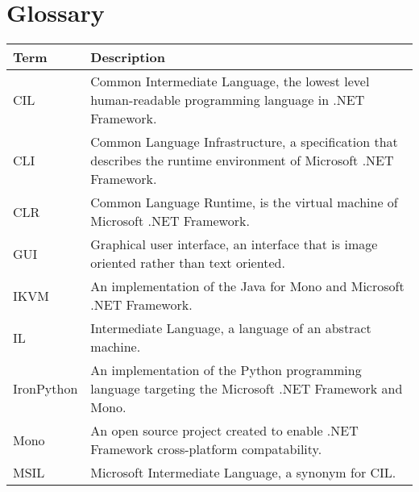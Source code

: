 \chapter*{Glossary}

\begin{center}
	\begin{tabular} { m{3cm} | m{11cm} }
		\hline
		\textbf{Term}	& \textbf{Description} \\ \hline
		CIL				& Common Intermediate Language, the lowest level human-readable programming language in .NET Framework. \\ \hline
		CLI				& Common Language Infrastructure, a specification that describes the runtime environment of Microsoft .NET Framework. \\ \hline
		CLR				& Common Language Runtime, is the virtual machine of Microsoft .NET Framework. \\ \hline
		GUI				& Graphical user interface, an interface that is image oriented rather than text oriented. \\ \hline
		IKVM			& An implementation of the Java for Mono and Microsoft .NET Framework. \\ \hline
		IL				& Intermediate Language, a language of an abstract machine. \\ \hline
		IronPython		& An implementation of the Python programming language targeting the Microsoft .NET Framework and Mono. \\ \hline
		Mono			& An open source project created to enable .NET Framework cross-platform compatability. \\ \hline
		MSIL			& Microsoft Intermediate Language, a synonym for CIL. \\ \hline
	\end{tabular}
\end{center}

